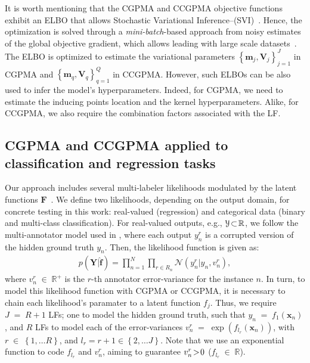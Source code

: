 \documentclass[journal]{IEEEtran}
\providecommand{\ve}[1]{{\bm{#1}}}%
\providecommand{\mat}[1]{{\bm{#1}}} %
\newcommand{\Real}{\mathbb{R}}
\DeclareMathOperator{\en}{\!\,\in\!\,}
\DeclareMathOperator{\igual}{\!\,=\!\,}
\providecommand{\s}[1]{\negthinspace#1\negthinspace}%
\providecommand{\ve}[1]{{\mathbf{#1}}}
\providecommand{\mat}[1]{{\mathbf{#1}}}
\newcommand{\gauss}{\mathcal{N}} %
\begin{document}
It is worth mentioning  that the CGPMA and CCGPMA objective functions exhibit an ELBO that allows Stochastic Variational Inference--(SVI)~\cite{blei2017variational}. Hence, the optimization is solved through a \textit{mini-batch}-based approach from noisy estimates of the global objective gradient, which allows leading with large scale datasets~\cite{hensman2015scalable,saul2016chained,moreno2018heterogeneous}. The ELBO is optimized to estimate the variational parameters $\left\{\ve{m}_j, \mat{V}_j\right\}_{j=1}^{J}$ in CGPMA and $\left\{\ve{m}_q, \mat{V}_q\right\}_{q=1}^{Q}$ in CCGPMA. However, such ELBOs can be also used to infer the model's hyperparameters. Indeed, for CGPMA, we need to estimate the inducing points location and the kernel hyperparameters. Alike, for CCGPMA, we also require the combination factors associated with the LF.


\subsection{CGPMA and CCGPMA applied to classification and regression tasks}
Our approach includes several multi-labeler likelihoods modulated by the latent functions $\mat{F}$~\cite{moreno2018heterogeneous}. We define two likelihoods, depending on the output domain, for concrete testing in this work: real-valued (regression) and categorical data (binary and multi-class classification).  For real-valued outputs, e.g., $\mathcal{Y} \s{\subset}\Real$, we follow the multi-annotator model used in \cite{raykar2010learning,groot2011learning,xiao2013learning,rodrigues2017learning}, where each output $y_n^r$ is a corrupted version of the hidden ground truth $y_n$. Then, the likelihood function is given as:
\begin{align}
\label{eq:RegLik}
p(\mat{Y}|\hat{\ve{f}}) = \prod^N_{n=1}\prod_{r\in R_n}\gauss\left(y_n^r|y_n,v_{n}^r\right),
\end{align}
where $v_{n}^r\en\Real^+$ is the $r$-th annotator error-variance for the instance $n$. In turn, to model this likelihood function with CGPMA or CCGPMA, it is necessary to chain each likelihood's paramater to a latent function $f_j$. Thus, we require $J\igual R+1$ LFs; one to model the hidden ground truth, such that $y_n\igual f_1(\ve{x}_n)$, and $R$ LFs to model each of the error-variances $v_{n}^r\igual \exp(f_{l_r}(\ve{x}_n))$, with $r\en \left\{1, \dots R\right\}$, and $l_r = r+1 \in \left\{2, \dots J\right\}$. Note that we use an exponential function to code $f_{l_r}$ and $v_{n}^r$, aiming to guarantee $v_{n}^r\s{>}0$ ($f_{l_r}\en \Real$).
\end{document}
